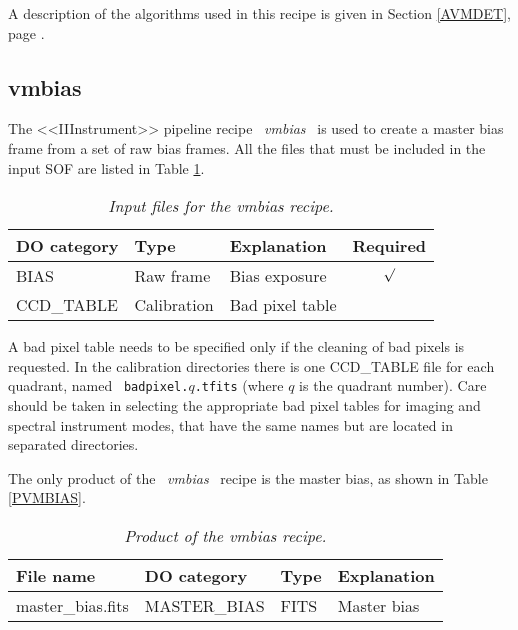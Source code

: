 A description of the algorithms used in this recipe is given in Section
\ref{AVMDET}, page \pageref{AVMDET}.

\subsection{vmbias}
\label{sec:UVMBIAS}

The <<IIInstrument>> pipeline recipe \ {\it vmbias} \ is used to create a master 
bias frame from a set of raw bias frames. All the files that must be 
included in the input SOF are listed in Table \ref{tab:IVMBIAS}.

\begin{table}[h]
  \begin{center}
    \begin{tabular}{|l|l|l|c|}
    \hline
      {\bf DO category} & {\bf Type} & {\bf Explanation} & {\bf Required} \\
    \hline 
      BIAS            & Raw frame   & Bias exposure         & $\surd$ \\
      CCD\_TABLE      & Calibration & Bad pixel table       &         \\
    \hline
    \end{tabular}
    \caption{\it Input files for the vmbias recipe.}
    \label{tab:IVMBIAS}
  \end{center}
\end{table}

A bad pixel table needs to be specified only if the cleaning of bad
pixels is requested. In the calibration directories there is one
CCD\_TABLE file for each quadrant, named \ {\tt badpixel.}$q${\tt .tfits}
(where $q$ is the quadrant number). Care should be taken in selecting
the appropriate bad pixel tables for imaging and spectral instrument
modes, that have the same names but are located in separated directories.

The only product of the \ {\it vmbias} \ recipe is the master bias, as 
shown in Table \ref{PVMBIAS}.

\begin{table}[h]
  \begin{center}
    \begin{tabular}{|l|l|l|l|}
    \hline
      {\bf File name} & {\bf DO category} & {\bf Type} & {\bf Explanation} \\
    \hline
      master\_bias.fits &  MASTER\_BIAS & FITS & Master bias \\
    \hline
    \end{tabular}
    \caption{\it Product of the vmbias recipe.}
    \label{tab:PVMBIAS}
  \end{center}
\end{table}

